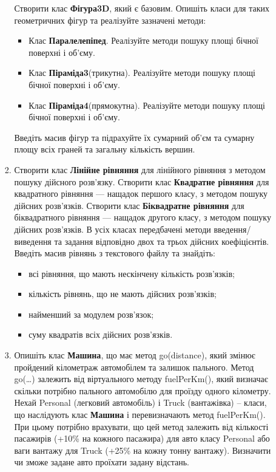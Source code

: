 \documentclass[a5paper,titlepage,openany,twoside,
]
{book_unv}%
\begin{document}
\begin{enumerate}
\begin{enumerate}
\begin{enumerate}
Створити клас \textbf{Фігура3D}, який є базовим.  Опишіть класи для 
таких геометричних фігур та реалізуйте зазначені методи:
\begin{itemize}
\item
  Клас \textbf{Паралелепіпед}. Реалізуйте методи пошуку площі бічної поверхні і
  об'єму.
\item
  Клас \textbf{Піраміда3}(трикутна). Реалізуйте методи пошуку площі бічної поверхні і
  об'єму.
\item
  Клас \textbf{Піраміда4}(прямокутна). Реалізуйте методи пошуку площі бічної поверхні і
  об'єму.
\end{itemize}
Введіть масив фігур та підрахуйте їх сумарний об'єм та сумарну площу всіх граней 
та загальну кількість вершин.

\item
Створити клас \textbf{Лінійне рівняння} для лінійного рівняння з методом пошуку дійсного розв'язку.
Створити клас \textbf{Квадратне рівняння} для квадратного рівняння --- нащадок першого класу,
з методом пошуку дійсних розв'язків.
Створити клас \textbf{Біквадратне рівняння} для біквадратного рівняння --- нащадок другого класу,
з методом пошуку дійсних розв'язків. В усіх класах передбачені методи введення/виведення та задання 
відповідно двох та трьох дійсних коефіцієнтів.
Введіть масив рівнянь з текстового файлу та знайдіть:
\begin{itemize}
\item
всі рівняння, що мають нескінчену кількість розв'язків;
\item
кількість рівнянь, що не мають дійсних розв'язків;
\item
найменший за модулем розв'язок;
\item
суму квадратів всіх дійсних розв'язків.
\end{itemize}

\item
  Опишіть клас \textbf{Машина}, що має метод go(distance), який змінює пройдений
  кілометраж автомобілем та залишок пального. Метод go(\ldots{})
  залежить від віртуального методу fuelPerKm(), який визначає скільки
  потрібно пального автомобілю для проїзду одного кілометру. Нехай
  Personal (легковий автомобіль) і Truck (вантажівка) -- класи, що
  наслідують клас \textbf{Машина} і перевизначають метод fuelPerKm(). При цьому
  потрібно врахувати, що цей метод залежить від кількості пасажирів
  (+10\% на кожного пасажира) для авто класу Personal або ваги вантажу
  для Truck (+25\% на кожну тонну вантажу). Визначити чи зможе задане
  авто проїхати задану відстань.


\end{enumerate}
\end{enumerate}
\end{enumerate}
\end{document}
